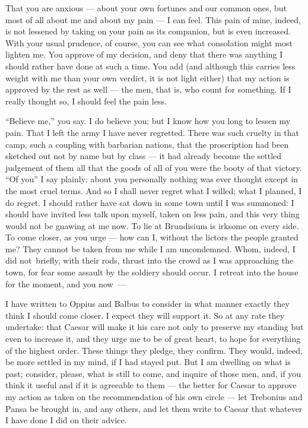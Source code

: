 

 That you are anxious --- about your own fortunes and our common ones, but most of all about me and about my pain --- I can feel. This pain of mine, indeed, is not lessened by taking on your pain as its companion, but is even increased. With your usual prudence, of course, you can see what consolation might most lighten me. You approve of my decision, and deny that there was anything I should rather have done at such a time. You add (and although this carries less weight with me than your own verdict, it is not light either) that my action is approved by the rest as well --- the men, that is, who count for something. If I really thought so, I should feel the pain less.

 ``Believe me,'' you say. I do believe you; but I know how you long to lessen my pain. That I left the army I have never regretted. There was such cruelty in that camp, such a coupling with barbarian nations, that the proscription had been sketched out not by name but by class --- it had already become the settled judgement of them all that the goods of all of you were the booty of that victory. ``Of you'' I say plainly: about you personally nothing was ever thought except in the most cruel terms. And so I shall never regret what I willed; what I planned, I do regret. I should rather have sat down in some town until I was summoned: I should have invited less talk upon myself, taken on less pain, and this very thing would not be gnawing at me now. To lie at Brundisium is irksome on every side. To come closer, as you urge --- how can I, without the lictors the people granted me? They cannot be taken from me while I am uncondemned. Whom, indeed, I \dag did not\dag\ briefly, with their rods, thrust into the crowd as I was approaching the town, for fear some assault by the soldiery should occur. \dag I retreat into the house for the moment, and you now\dag\ ---

 I have written to Oppius and Balbus to consider in what manner exactly they think I should come closer. I expect they will support it. So at any rate they undertake: that Caesar will make it his care not only to preserve my standing but even to increase it, and they urge me to be of great heart, to hope for everything of the highest order. These things they pledge, they confirm. They would, indeed, be more settled in my mind, if I had stayed put. But I am dwelling on what is past; consider, please, what is still to come, and inquire of those men, and, if you think it useful and if it is agreeable to them --- the better for Caesar to approve my action as taken on the recommendation of his own circle --- let Trebonius and Pansa be brought in, and any others, and let them write to Caesar that whatever I have done I did on their advice.

